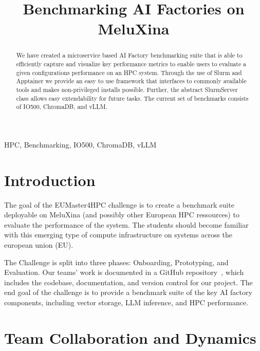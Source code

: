 \documentclass[conference,12pt]{IEEEtran}
\begin{document}
    \title{Benchmarking AI Factories on MeluXina}
    \author{
    }

    \maketitle

    \begin{abstract}

        We have created a microservice based AI Factory benchmarking suite that is able to efficiently capture and visualize key performance metrics to enable users to evaluate a given configurations performance on an HPC system. Through the use of Slurm and Apptainer we provide an easy to use framework that interfaces to commonly available tools and makes non-privileged installs possible. Further, the abstract SlurmServer class allows easy extendability for future tasks. The current set of benchmarks consists of IO500, ChromaDB, and vLLM.

    \end{abstract}

    \begin{IEEEkeywords}
        HPC, Benchmarking, IO500, ChromaDB, vLLM
    \end{IEEEkeywords}

    \section{Introduction}
    The goal of the EUMaster4HPC challenge is to create a benchmark suite deployable on MeluXina (and possibly other European HPC ressources) to evaluate the performance of the system.
    The students should become familiar with this emerging type of compute infrastructure on systems across the european union (EU).

    The Challenge is split into three phases: Onboarding, Prototyping, and Evaluation.
    Our teams' work is documented in a GitHub repository~\cite{Team7}, which includes the codebase, documentation, and version control for our project.
    The end goal of the challenge is to provide a benchmark suite of the key AI factory components, including vector storage, LLM inference, and HPC performance.

    \section{Team Collaboration and Dynamics}
\end{document}
